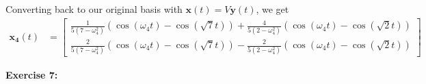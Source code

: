 \documentclass[12pt]{article}
\begin{document}
Converting back to our original basis with $\mathbf{x}(t) = V\mathbf{y}(t)$, we get
\begin{align*}
    \mathbf{x_4}(t) & = \begin{bmatrix}
                            \frac{1}{5(7-\omega_4^2)}(\cos(\omega_{4}t) - \cos(\sqrt{7}t)) + \frac{4}{5(2-\omega_4^2)}(\cos(\omega_{4}t) - \cos(\sqrt{2}t)) \\
                            \frac{2}{5(7-\omega_4^2)}(\cos(\omega_{4}t) - \cos(\sqrt{7}t)) - \frac{2}{5(2-\omega_4^2)}(\cos(\omega_{4}t) - \cos(\sqrt{2}t))
                        \end{bmatrix}
\end{align*}

\newpage{}

\noindent{}\textbf{Exercise 7:}
\end{document}
